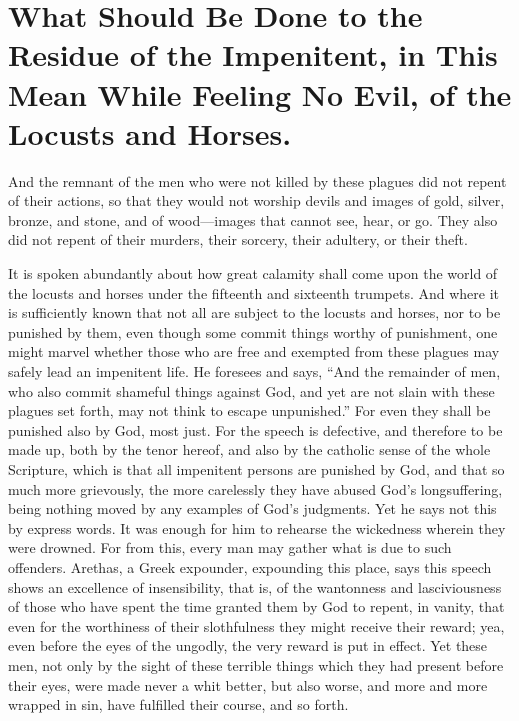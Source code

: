\chapter[Sermon 42. What Should Be Done to the Residue of the Impenitent, in This Mean While Feeling No Evil, of the Locusts and Horses.]{What Should Be Done to the Residue of the Impenitent, in This Mean While Feeling No Evil, of the Locusts and Horses.}
\label{sermon:042}

And the remnant of the men who were not killed by these plagues did not repent of their actions, so that they would not worship devils and images of gold, silver, bronze, and stone, and of wood—images that cannot see, hear, or go. They also did not repent of their murders, their sorcery, their adultery, or their theft.

It is spoken abundantly about how great calamity shall come upon the world of the locusts and horses under the fifteenth and sixteenth trumpets. And where it is sufficiently known that not all are subject to the locusts and horses, nor to be punished by them, even though some commit things worthy of punishment, one might marvel whether those who are free and exempted from these plagues may safely lead an impenitent life. He foresees and says, “And the remainder of men, who also commit shameful things against God, and yet are not slain with these plagues set forth, may not think to escape unpunished.” For even they shall be punished also by God, most just. For the speech is defective, and therefore to be made up, both by the tenor hereof, and also by the catholic sense of the whole Scripture, which is that all impenitent persons are punished by God, and that so much more grievously, the more carelessly they have abused God’s longsuffering, being nothing moved by any examples of God’s judgments. Yet he says not this by express words. It was enough for him to rehearse the wickedness wherein they were drowned. For from this, every man may gather what is due to such offenders. Arethas, a Greek expounder, expounding this place, says this speech shows an excellence of insensibility, that is, of the wantonness and lasciviousness of those who have spent the time granted them by God to repent, in vanity, that even for the worthiness of their slothfulness they might receive their reward; yea, even before the eyes of the ungodly, the very reward is put in effect. Yet these men, not only by the sight of these terrible things which they had present before their eyes, were made never a whit better, but also worse, and more and more wrapped in sin, have fulfilled their course, and so forth.

